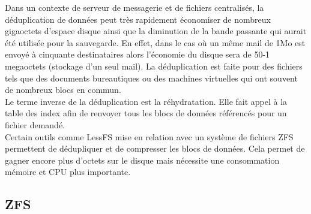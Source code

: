 \documentclass[a4paper,11pt]{report}
\begin{document}
Dans un contexte de serveur de messagerie et de fichiers centralisés, la déduplication de données peut très rapidement économiser de nombreux gigaoctets d'espace disque ainsi que la diminution de la bande passante qui aurait été utilisée pour la sauvegarde. En effet, dans le cas où un même mail de 1Mo est envoyé à cinquante destinataires alors l'économie du disque sera de 50-1 megaoctets (stockage d'un seul mail). La déduplication est faite pour des fichiers tels que des documents bureautiques ou des machines virtuelles qui ont souvent de nombreux blocs en commun.\\
Le terme inverse de la déduplication est la réhydratation. Elle fait appel à la table des index afin de renvoyer tous les blocs de données référencés pour un fichier demandé.\\

Certain outils comme LessFS mise en relation avec un système de fichiers ZFS permettent de dédupliquer et de compresser les blocs de données. Cela permet de gagner encore plus d'octets sur le disque mais nécessite une consommation mémoire et CPU plus importante.

	\subsection{ZFS}
\end{document}
